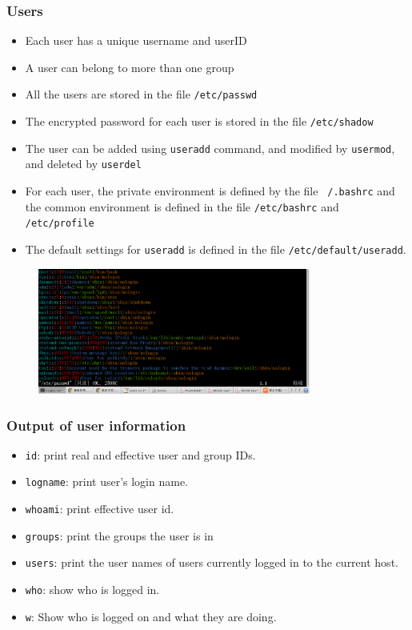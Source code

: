 \documentclass[red]{beamer}
\begin{document}
\begin{CJK*}{UTF8}{gbsn}
\begin{frame}
\frametitle{Users}
\begin{itemize}
	\item Each user has a unique username and userID
	\item A user can belong to more than one group
	\item All the users are stored in the file \texttt{/etc/passwd}
	\item The encrypted password for each user is stored in the file 
		\texttt{/etc/shadow}
	\item The user can be added using \lstinline{useradd} command, and 
		modified by \lstinline{usermod}, and deleted by \lstinline{userdel}
	\item For each user, the private environment is defined by the file 
		\texttt{~/.bashrc} and the common environment is defined in the 
		file \texttt{/etc/bashrc} and \texttt{/etc/profile}
	\item The default settings for \lstinline{useradd} is defined in the 
		file \texttt{/etc/default/useradd}.
\end{itemize}
\begin{figure}[ht]
\includegraphics[width=0.80\textwidth]{images/passwd.png}
\end{figure}
\end{frame}


\begin{frame}
\frametitle{Output of user information}
\begin{itemize}
	\item \lstinline{id}: print real and effective user and group IDs.
	\item \lstinline{logname}: print user's login name.
	\item \lstinline{whoami}: print effective user id.
	\item \lstinline{groups}: print the groups the user is in
	\item \lstinline{users}: print the user names of users currently logged 
		in to the current host.
	\item \lstinline{who}: show who is logged in.
	\item \lstinline{w}: Show  who is logged on and what they are doing.
\end{itemize}
\end{frame}



\end{CJK*}
\end{document}
